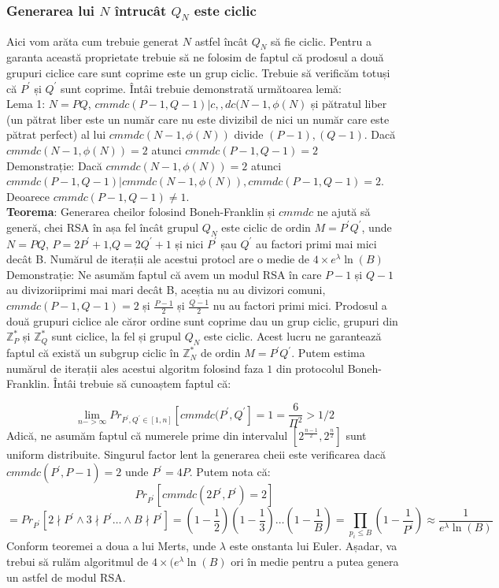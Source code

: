 \documentclass[12pt, oneside]{book}
\begin{document}
\subsubsection{Generarea lui $N$ întrucât $Q_N$ este ciclic}
Aici vom arăta cum trebuie generat $N$ astfel încât $Q_N$ să fie ciclic. Pentru a garanta această proprietate trebuie să ne folosim de faptul că prodosul a două grupuri ciclice care sunt coprime este un grup ciclic. Trebuie să verificăm totuși că $P^{'}$ și $Q^{'}$ sunt coprime. Întâi trebuie demonstrată următoarea lemă: \\
Lema 1: $N=PQ$, $cmmdc(P-1,Q-1)|c,,dc(N-1,\phi(N)$ și pătratul liber (un pătrat liber este un număr care nu este divizibil de nici un număr care este pătrat perfect) al lui $cmmdc(N-1,\phi(N))$ divide $(P-1),(Q-1)$. Dacă $cmmdc(N-1,\phi(N))=2$ atunci $cmmdc(P-1,Q-1)=2$ \\
Demonstrație: Dacă $cmmdc(N-1,\phi(N))=2$ atunci $cmmdc(P-1,Q-1)|cmmdc(N-1,\phi(N)), cmmdc(P-1,Q-1)=2$. Deoarece $cmmdc(P-1,Q-1) \neq 1$.\\
\textbf{Teorema}: Generarea cheilor folosind Boneh-Franklin și $cmmdc$ ne ajută să generă, chei RSA în așa fel încât grupul $Q_N$ este ciclic de ordin $M=P^{'}Q^{'}$, unde $N=PQ$, $P=2P^{'}+1$,$Q=2Q^{'}+1$ și nici $P^{'}$ șau $Q^{'}$ au factori primi mai mici decât B. Numărul de iterații ale acestui protocl are o medie de $ 4 \times e^{\lambda} \ln(B)$ \\
Demonstrație: Ne asumăm faptul că avem un modul RSA în care $P-1$ și $Q-1$ au divizoriiprimi mai mari decât B, aceștia nu au divizori comuni, $cmmdc(P-1,Q-1) = 2$ și $\frac{P-1}{2}$ și $\frac{Q-1}{2}$ nu au factori primi mici. Prodosul a două grupuri ciclice ale căror ordine sunt coprime dau un grup ciclic, grupuri din $\mathbb{Z}_{P}^{*}$ și $\mathbb{Z}_{Q}^{*}$ sunt ciclice, la fel și grupul $Q_N$ este ciclic. Acest lucru ne garantează faptul că există un subgrup ciclic în $\mathbb{Z}_{N}^{*}$ de ordin $M=P^{'}Q^{'}$. Putem estima numărul de iterații ales acestui algoritm folosind faza $1$ din protocolul Boneh-Franklin. Întâi trebuie să cunoaștem faptul că:

$$\lim_{n-> \infty} Pr_{P^{'},Q^{'}  \in [1,n] } [cmmdc(P^{'},Q^{'}]= 1 =  \frac{6}{\Pi^{2}} > 1/2 $$ 
Adică, ne asumăm faptul că numerele prime din intervalul $ \left[  2^{\frac{n-1}{2}}, 2^{\frac{n}{2}}         \right] $ sunt uniform distribuite. Singurul factor lent la generarea cheii este verificarea dacă $cmmdc(P^{'},P-1)=2$ unde $P^{'} = 4P$. Putem nota că:
$$Pr_{P^{'}}[ cmmdc(2P^{'},P^{'}) =2 ]$$
$$ = Pr_{P^{'}} [2 \nmid P^{'} \wedge 3 \nmid P^{'}  \dots    \wedge B \nmid P^{'} ] =(1- \frac{1}{2})(1 - \frac{1}{3}) \dots (1- \frac{1}{B}) = \prod_{p_i \leq B}^{} (1- \frac{1}{P^i}) \approx \frac{1}{e^{\lambda} \ln(B)}  $$
Conform teoremei a doua a lui Merts, unde $\lambda$ este onstanta lui Euler. Așadar, va trebui să rulăm algoritmul de $ 4 \times (e^{\lambda} \ln(B)$ ori în medie pentru a putea genera un astfel de modul RSA. 
\end{document}
